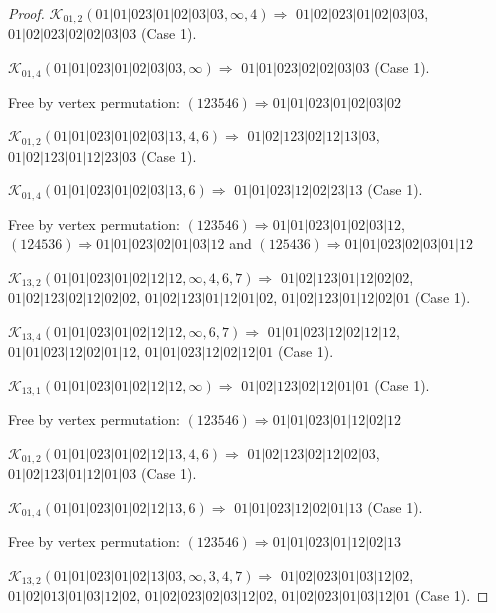 \documentclass[12pt]{article}
\theoremstyle{plain}
\theoremstyle{definition}
\theoremstyle{remark}
\newcommand{\fancy}[1]{\mathcal{#1}}
\def\K{\fancy{K}}
\begin{document}
\begin{proof}
	$\K_{01,2}(01|01|023|01|02|03|03,\infty,4)\Rightarrow $ $01|02|023|01|02|03|03$, $01|02|023|02|02|03|03$ (Case 1).
	
	$\K_{01,4}(01|01|023|01|02|03|03,\infty)\Rightarrow $ $01|01|023|02|02|03|03$ (Case 1).
	
	
	
	Free by vertex permutation: $(1 2 3 5 4 6)\Rightarrow 01|01|023|01|02|03|02$
	
	
	
	\bigskip
	
	$\K_{01,2}(01|01|023|01|02|03|13,4, 6)\Rightarrow $ $01|02|123|02|12|13|03$, $01|02|123|01|12|23|03$ (Case 1).
	
	$\K_{01,4}(01|01|023|01|02|03|13,6)\Rightarrow $ $01|01|023|12|02|23|13$ (Case 1).
	
	
	
	Free by vertex permutation: $(1 2 3 5 4 6)\Rightarrow 01|01|023|01|02|03|12$, $(1 2 4 5 3 6)\Rightarrow 01|01|023|02|01|03|12$ and $(1 2 5 4 3 6)\Rightarrow 01|01|023|02|03|01|12$
	
	
	
	\bigskip
	
	$\K_{13,2}(01|01|023|01|02|12|12,\infty,4, 6, 7)\Rightarrow $ $01|02|123|01|12|02|02$, $01|02|123|02|12|02|02$, $01|02|123|01|12|01|02$, $01|02|123|01|12|02|01$ (Case 1).
	
	$\K_{13,4}(01|01|023|01|02|12|12,\infty,6, 7)\Rightarrow $ $01|01|023|12|02|12|12$, $01|01|023|12|02|01|12$, $01|01|023|12|02|12|01$ (Case 1).
	
	$\K_{13,1}(01|01|023|01|02|12|12,\infty)\Rightarrow $ $01|02|123|02|12|01|01$ (Case 1).
	
	
	
	Free by vertex permutation: $(1 2 3 5 4 6)\Rightarrow 01|01|023|01|12|02|12$
	
	
	
	\bigskip
	
	$\K_{01,2}(01|01|023|01|02|12|13,4, 6)\Rightarrow $ $01|02|123|02|12|02|03$, $01|02|123|01|12|01|03$ (Case 1).
	
	$\K_{01,4}(01|01|023|01|02|12|13,6)\Rightarrow $ $01|01|023|12|02|01|13$ (Case 1).
	
	
	
	Free by vertex permutation: $(1 2 3 5 4 6)\Rightarrow 01|01|023|01|12|02|13$
	
	
	
	\bigskip
	
	$\K_{13,2}(01|01|023|01|02|13|03,\infty,3, 4, 7)\Rightarrow $ $01|02|023|01|03|12|02$, $01|02|013|01|03|12|02$, $01|02|023|02|03|12|02$, $01|02|023|01|03|12|01$ (Case 1).
	

\end{proof}
\end{document}
